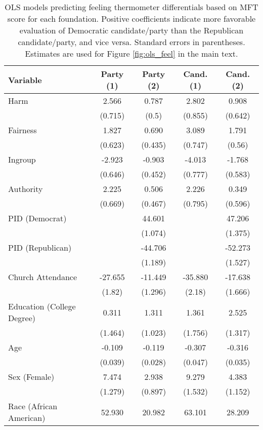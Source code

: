 \begin{table}[h]
\centering
\caption{OLS models predicting feeling thermometer differentials based on
           MFT score for each foundation. Positive coefficients indicate more favorable evaluation 
           of Democratic candidate/party than the Republican candidate/party, and vice versa. 
           Standard errors in parentheses. Estimates are used for Figure \ref{fig:ols_feel} 
           in the main text.} 
\label{tab:ols_feel}
\begingroup\footnotesize
\begin{tabular}{lcccc}
  \hline
Variable & Party (1) & Party (2) & Cand. (1) & Cand. (2) \\ 
  \hline
Harm &   2.566 &   0.787 &   2.802 &   0.908 \\ 
   & (0.715) & (0.5) & (0.855) & (0.642) \\ 
  Fairness &   1.827 &   0.690 &   3.089 &   1.791 \\ 
   & (0.623) & (0.435) & (0.747) & (0.56) \\ 
  Ingroup &  -2.923 &  -0.903 &  -4.013 &  -1.768 \\ 
   & (0.646) & (0.452) & (0.777) & (0.583) \\ 
  Authority &   2.225 &   0.506 &   2.226 &   0.349 \\ 
   & (0.669) & (0.467) & (0.795) & (0.596) \\ 
  PID (Democrat) &  &  44.601 &  &  47.206 \\ 
   &  & (1.074) &  & (1.375) \\ 
  PID (Republican) &  & -44.706 &  & -52.273 \\ 
   &  & (1.189) &  & (1.527) \\ 
  Church Attendance & -27.655 & -11.449 & -35.880 & -17.638 \\ 
   & (1.82) & (1.296) & (2.18) & (1.666) \\ 
  Education (College Degree) &   0.311 &   1.311 &   1.361 &   2.525 \\ 
   & (1.464) & (1.023) & (1.756) & (1.317) \\ 
  Age &  -0.109 &  -0.119 &  -0.307 &  -0.316 \\ 
   & (0.039) & (0.028) & (0.047) & (0.035) \\ 
  Sex (Female) &   7.474 &   2.938 &   9.279 &   4.383 \\ 
   & (1.279) & (0.897) & (1.532) & (1.152) \\ 
  Race (African American) &  52.930 &  20.982 &  63.101 &  28.209 \\ 

\end{tabular}
\end{table}
